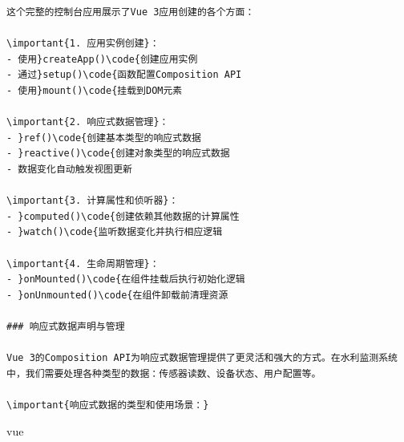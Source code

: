 \begin{lstlisting}
这个完整的控制台应用展示了Vue 3应用创建的各个方面：

\important{1. 应用实例创建}：
- 使用}createApp()\code{创建应用实例
- 通过}setup()\code{函数配置Composition API
- 使用}mount()\code{挂载到DOM元素

\important{2. 响应式数据管理}：
- }ref()\code{创建基本类型的响应式数据
- }reactive()\code{创建对象类型的响应式数据
- 数据变化自动触发视图更新

\important{3. 计算属性和侦听器}：
- }computed()\code{创建依赖其他数据的计算属性
- }watch()\code{监听数据变化并执行相应逻辑

\important{4. 生命周期管理}：
- }onMounted()\code{在组件挂载后执行初始化逻辑
- }onUnmounted()\code{在组件卸载前清理资源

### 响应式数据声明与管理

Vue 3的Composition API为响应式数据管理提供了更灵活和强大的方式。在水利监测系统中，我们需要处理各种类型的数据：传感器读数、设备状态、用户配置等。

\important{响应式数据的类型和使用场景：}

\end{lstlisting}

vue

